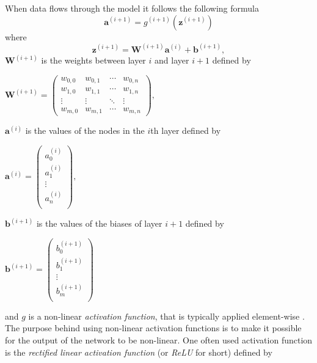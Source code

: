 \documentclass[./main.tex]{subfiles}
\begin{document}
When data flows through the model it follows the following formula
$$\bm{a}^{(i + 1)} = g^{(i + 1)} \left( \bm{z}^{(i + 1)} \right)$$
where
$$\bm{z}^{(i + 1)} = \bm{W}^{(i + 1)} \bm{a}^{(i)} + \bm{b}^{(i + 1)},$$
$\bm{W}^{(i + 1)}$ is the weights between layer $i$ and layer $i + 1$ defined by
\begin{center}
    \begin{math}
        \bm{W}^{(i + 1)} =
        \begin{pmatrix}
            w_{0, 0} & w_{0, 1} & \cdots & w_{0, n} \\
            w_{1, 0} & w_{1, 1} & \cdots & w_{1, n} \\
            \vdots & \vdots & \ddots & \vdots \\
            w_{m, 0} & w_{m, 1} & \cdots & w_{m, n}
        \end{pmatrix}
        ,
    \end{math}
\end{center}
$\bm{a}^{(i)}$ is the values of the nodes in the $i$th layer defined by
\begin{center}
    \begin{math}
        \bm{a}^{(i)} =
        \begin{pmatrix}
            a_{0} ^{(i)} \\
            a_{1} ^{(i)} \\
            \vdots \\
            a_{n} ^{(i)} \\
        \end{pmatrix}
        ,
    \end{math}
\end{center}
$\bm{b}^{(i + 1)}$ is the values of the biases of layer $i + 1$ defined by
\begin{center}
    \begin{math}
        \bm{b}^{(i + 1)} =
        \begin{pmatrix}
            b_{0} ^{(i + 1)} \\
            b_{1} ^{(i + 1)} \\
            \vdots \\
            b_{m} ^{(i + 1)} \\
        \end{pmatrix}
    \end{math}
\end{center}
and $g$ is a non-linear \textit{activation function}, that is typically applied element-wise \cite{DeepLearning} \cite{3b1b_1}. The purpose behind using non-linear activation functions is to make it possible for the output of the network to be non-linear. One often used activation function is the \textit{rectified linear activation function} (or \textit{ReLU} for short) defined by
\end{document}

